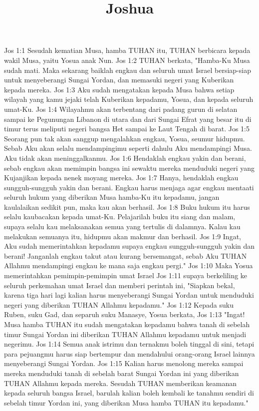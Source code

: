 

\title{Joshua}

Jos 1:1  Sesudah kematian Musa, hamba TUHAN itu, TUHAN berbicara kepada wakil Musa, yaitu Yosua anak Nun.
Jos 1:2  TUHAN berkata, "Hamba-Ku Musa sudah mati. Maka sekarang baiklah engkau dan seluruh umat Israel bersiap-siap untuk menyeberangi Sungai Yordan, dan memasuki negeri yang Kuberikan kepada mereka.
Jos 1:3  Aku sudah mengatakan kepada Musa bahwa setiap wilayah yang kamu jejaki telah Kuberikan kepadamu, Yosua, dan kepada seluruh umat-Ku.
Jos 1:4  Wilayahmu akan terbentang dari padang gurun di selatan sampai ke Pegunungan Libanon di utara dan dari Sungai Efrat yang besar itu di timur terus meliputi negeri bangsa Het sampai ke Laut Tengah di barat.
Jos 1:5  Seorang pun tak akan sanggup mengalahkan engkau, Yosua, seumur hidupmu. Sebab Aku akan selalu mendampingimu seperti dahulu Aku mendampingi Musa. Aku tidak akan meninggalkanmu.
Jos 1:6  Hendaklah engkau yakin dan berani, sebab engkau akan memimpin bangsa ini sewaktu mereka menduduki negeri yang Kujanjikan kepada nenek moyang mereka.
Jos 1:7  Hanya, hendaklah engkau sungguh-sungguh yakin dan berani. Engkau harus menjaga agar engkau mentaati seluruh hukum yang diberikan Musa hamba-Ku itu kepadamu, jangan kaulalaikan sedikit pun, maka kau akan berhasil.
Jos 1:8  Buku hukum itu harus selalu kaubacakan kepada umat-Ku. Pelajarilah buku itu siang dan malam, supaya selalu kau melaksanakan semua yang tertulis di dalamnya. Kalau kau melakukan semuanya itu, hidupmu akan makmur dan berhasil.
Jos 1:9  Ingat, Aku sudah memerintahkan kepadamu supaya engkau sungguh-sungguh yakin dan berani! Janganlah engkau takut atau kurang bersemangat, sebab Aku TUHAN Allahmu mendampingi engkau ke mana saja engkau pergi."
Jos 1:10  Maka Yosua memerintahkan pemimpin-pemimpin umat Israel
Jos 1:11  supaya berkeliling ke seluruh perkemahan umat Israel dan memberi perintah ini, "Siapkan bekal, karena tiga hari lagi kalian harus menyeberangi Sungai Yordan untuk menduduki negeri yang diberikan TUHAN Allahmu kepadamu."
Jos 1:12  Kepada suku Ruben, suku Gad, dan separuh suku Manasye, Yosua berkata,
Jos 1:13  "Ingat! Musa hamba TUHAN itu sudah mengatakan kepadamu bahwa tanah di sebelah timur Sungai Yordan ini diberikan TUHAN Allahmu kepadamu untuk menjadi negerimu.
Jos 1:14  Semua anak istrimu dan ternakmu boleh tinggal di sini, tetapi para pejuangmu harus siap bertempur dan mendahului orang-orang Israel lainnya menyeberangi Sungai Yordan.
Jos 1:15  Kalian harus menolong mereka sampai mereka menduduki tanah di sebelah barat Sungai Yordan ini yang diberikan TUHAN Allahmu kepada mereka. Sesudah TUHAN memberikan keamanan kepada seluruh bangsa Israel, barulah kalian boleh kembali ke tanahmu sendiri di sebelah timur Yordan ini, yang diberikan Musa hamba TUHAN itu kepadamu."
